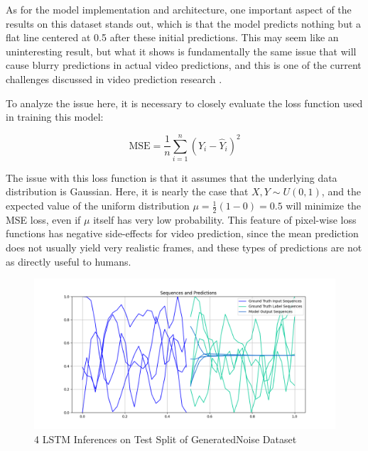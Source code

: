 \documentclass{scrartcl}
\begin{document}
As for the model implementation and architecture, one important aspect of the
results on this dataset stands out, which is that the model predicts nothing
but a flat line centered at 0.5 after these initial predictions. This may seem
like an uninteresting result, but what it shows is fundamentally the same issue
that will cause blurry predictions in actual video predictions, and this is one
of the current challenges discussed in video prediction research
\cite{video_prediction_survey}.

To analyze the issue here, it is necessary to closely evaluate the loss
function used in training this model:

\begin{equation}
	\text{MSE} = \frac{1}{n} \sum_{i = 1}^n ( Y_i - \hat{Y}_i )^2
	 \label{eq:mseloss}
\end{equation}

The issue with this loss function is that it assumes that the underlying data
distribution is Gaussian. Here, it is nearly the case that $X, Y \sim U(0, 1)$,
and the expected value of the uniform distribution $\mu = \frac{1}{2} (1 - 0) =
0.5$ will minimize the MSE loss, even if $\mu$ itself has very low probability.
This feature of pixel-wise loss functions has negative side-effects for video
prediction, since the mean prediction does not usually yield very realistic
frames, and these types of predictions are not as directly useful to humans.
 
\begin{figure}[H]
	\centering
	\includegraphics[width=1\textwidth]{inferences/noise/3layer_s13.png}
	\caption{4 LSTM Inferences on Test Split of GeneratedNoise Dataset}
	\label{inf:lstm_noise_inference}
\end{figure}

\end{document}

